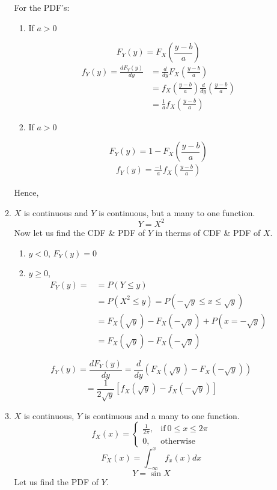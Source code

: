 \documentclass{article}
\begin{document}
\begin{itemize}
\begin{enumerate}
        For the PDF's:
        \begin{enumerate}
            \item If $a>0$

            $$ F_Y(y)= F_X\left( \frac{y-b}{a}\right)$$
            \begin{align*}
                f_Y(y)= \frac{dF_Y(y)}{dy} &= \frac{d}{dy}F_X\left( \frac{y-b}{a} \right)\\
                &= f_X \left( \frac{y-b}{a} \right)\frac{d}{dy}\left(\frac{y-b}{a} \right) \\
                &= \frac{1}{a}f_X\left(\frac{y-b}{a} \right)
            \end{align*}

            \item If $a>0$

            $$ F_Y(y)= 1- F_X\left( \frac{y-b}{a} \right)$$
            \begin{align*}
                f_Y(y)= \frac{-1}{a}f_X\left(\frac{y-b}{a} \right)
            \end{align*}


        \end{enumerate}

        Hence,
        \item $X$ is continuous and $Y$ is continuous, but a many to one function.
        $$ Y= X^2$$
        Now let us find the CDF \& PDF of $Y$ in therms of CDF \& PDF of $X$.
        \begin{enumerate}
            \item $y<0$, $F_Y(y)=0$
            \item $y \geq 0$,
            \begin{align*}
                F_Y(y)= &= P(Y \leq y) \\
                    &= P(X^2 \leq y) = P(-\sqrt{y} \leq x \leq \sqrt{y}) \\
                    &= F_X(\sqrt{y})- F_X(-\sqrt{y}) + P(x= -\sqrt{y}) \\
                    &= F_X(\sqrt{y})- F_X(-\sqrt{y})
            \end{align*}
        \end{enumerate}

        $$ f_Y(y)= \frac{dF_Y(y)}{dy}= \frac{d}{dy}(F_X(\sqrt{y})- F_X(-\sqrt{y}))$$
        $$ = \frac{1}{2\sqrt{y}}[f_X(\sqrt{y})- f_X(-\sqrt{y})]$$
        \item $X$ is continuous, $Y$ is continuous and a many to one function.
        \begin{equation*}
            f_X (x)=
            \begin{cases}
              \frac{1}{2\pi}, & \text{if}\ 0 \leq x \leq 2\pi \\
              0, & \text{otherwise}\
            \end{cases}
        \end{equation*}
        $$ F_X(x)= \int_{-\infty}^{x} f_x(x)dx$$
        $$ Y=\sin X$$
        Let us find the PDF of $Y$.


\end{enumerate}
\end{itemize}
\end{document}
